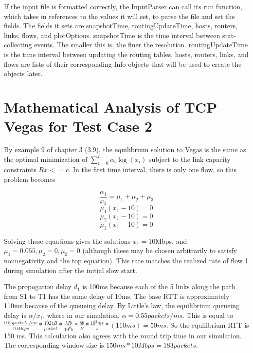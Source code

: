 \documentclass{article}
\begin{document}
	If the input file is formatted correctly, the InputParser can call its run function, which takes in references to the values it will set, to parse the file and set the fields. The fields it sets are snapshotTime, routingUpdateTime, hosts, routers, links, flows, and plotOptions. snapshotTime is the time interval between stat-collecting events. The smaller this is, the finer the resolution. routingUpdateTime is the time interval between updating the routing tables. hosts, routers, links, and flows are lists of their corresponding Info objects that will be used to create the objects later.















\section{Mathematical Analysis of TCP Vegas for Test Case 2}

By example 9 of chapter 3 (3.9), the equilibrium solution to Vegas is the same as the optimal minimization of $\displaystyle\sum\limits_{i=0}^n \alpha_i \log(x_i)$ subject to the link capacity constraints $Rx <= c$. In the first time interval, there is only one flow, so this problem becomes

$$\frac{\alpha_1}{x_1}=\mu_1 + \mu_2 + \mu_3$$
$$\mu_1 (x_1 - 10) = 0$$
$$\mu_2 (x_1 - 10) = 0$$
$$\mu_3 (x_1 - 10) = 0$$

Solving these equations gives the solutions $x_1=10$Mbps, and $\mu_1 = 0.055, \mu_2 = 0, \mu_3 = 0$ (although these may be chosen arbitrarily to satisfy nonnegativity and the top equation). This rate matches the realized rate of flow 1 during simulation after the initial slow start.

The propogation delay $d_1$ is 100ms because each of the 5 links along the path from S1 to T1 has the same delay of 10ms. The base RTT is approximately 110ms because of the queueing delay. By Little's law, the equilibrium queueing delay is $\alpha /  x_1$, where in our simulation, $\alpha = 0.55 packets/ms$. This is equal to $\frac{0.55 packets/ms}{10 Mbps} * \frac{1024 B}{packet} * \frac{Mb}{10^6 b} * \frac{8 b}{B} * \frac{10^3 ms}{s} * (110 ms) = 50 ms$. So the equilibrium RTT is 150 ms. This calculation also agrees with the round trip time in our simulation. The corresponding window size is $150ms * 10Mbps = 183 packets$.
\end{document}

